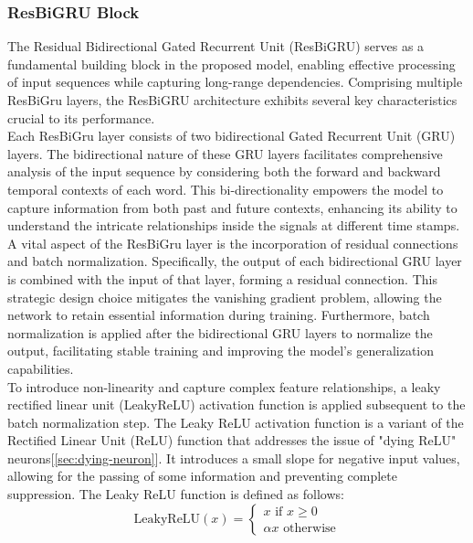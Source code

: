 \documentclass[a4paper, noexaminfo]{sapthesis}
\begin{document}
\subsubsection{ResBiGRU Block}
The Residual Bidirectional Gated Recurrent Unit (ResBiGRU) serves as a 
fundamental building block in the proposed model, enabling effective 
processing of input sequences while capturing long-range dependencies. 
Comprising multiple ResBiGru layers, the ResBiGRU architecture 
exhibits several key characteristics crucial to its performance.\newline \\
Each ResBiGru layer consists of two bidirectional Gated Recurrent 
Unit (GRU) layers. The bidirectional nature of these GRU layers 
facilitates comprehensive analysis of the input sequence by 
considering both the forward and backward temporal contexts 
of each word. This bi-directionality empowers the model to 
capture information from both past and future contexts, enhancing 
its ability to understand the intricate relationships inside the signals 
at different time stamps. \newline \\
A vital aspect of the ResBiGru layer is the incorporation of residual 
connections and batch normalization. Specifically, the output of each 
bidirectional GRU layer is combined with the input of that layer, 
forming a residual connection. This strategic design choice mitigates 
the vanishing gradient problem, allowing the network to retain essential 
information during training. Furthermore, batch normalization is applied 
after the bidirectional GRU layers to normalize the output, facilitating 
stable training and improving the model's generalization capabilities.\newline \\
To introduce non-linearity and capture complex feature relationships, 
a leaky rectified linear unit (LeakyReLU) activation function is applied 
subsequent to the batch normalization step. The Leaky ReLU activation 
function is a variant of the Rectified Linear Unit (ReLU) function 
that addresses the issue of "dying ReLU" neurons[\ref{sec:dying-neuron}]. It introduces a 
small slope for negative input values, allowing for the passing of 
some information and preventing complete suppression. The Leaky ReLU 
function is defined as follows:
  \[
    \text{LeakyReLU}(x) =
  \begin{cases}
   x \text{ if } x \geq 0 \\
  \alpha x \text{ otherwise}
  \end{cases}
  \]
\end{document}
